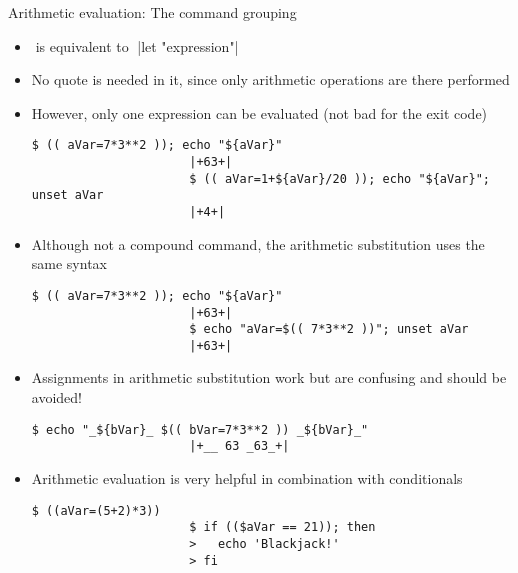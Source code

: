 \begin{frame}[fragile]{Arithmetic evaluation: The command grouping \PB{\texttt{((\ldots))}}}
    \vspace{-4mm}
    \begin{overlayarea}{\textwidth}{0.7\textheight}
        \begin{itemize}
            \item<only@1>  $\;$is  equivalent to$\;$ \bash|let "expression"|
            \item<only@1> No quote is needed in it, since only arithmetic operations are there performed
            \item<only@1> However, only one expression can be evaluated (not bad for the exit code)
                  \begin{lstlisting}[style=MyBash, style=oddnumbers, aboveskip=2mm, belowskip=-6mm]
                      $ (( aVar=7*3**2 )); echo "${aVar}"
                      |+63+|
                      $ (( aVar=1+${aVar}/20 )); echo "${aVar}"; unset aVar
                      |+4+|
                  \end{lstlisting}
            \item<only@1> Although not a compound command, the arithmetic substitution uses the same syntax
                  \begin{lstlisting}[style=MyBash, style=oddnumbers, aboveskip=2mm, belowskip=-6mm]
                      $ (( aVar=7*3**2 )); echo "${aVar}"
                      |+63+|
                      $ echo "aVar=$(( 7*3**2 ))"; unset aVar
                      |+63+|
                  \end{lstlisting}
            \item<only@1> Assignments in arithmetic substitution work but are confusing and should be avoided!
                  \begin{lstlisting}[style=MyBash, style=oddnumbers, aboveskip=2mm, belowskip=-6mm]
                      $ echo "_${bVar}_ $(( bVar=7*3**2 )) _${bVar}_"
                      |+__ 63 _63_+|
                  \end{lstlisting}
            \item<only@2> Arithmetic evaluation is very helpful in combination with conditionals
                  \begin{lstlisting}[style=MyBash, aboveskip=2mm, belowskip=-6mm]
                      $ ((aVar=(5+2)*3))
                      $ if (($aVar == 21)); then
                      >   echo 'Blackjack!'
                      > fi

\end{lstlisting}
\end{itemize}
\end{overlayarea}
\end{frame}

